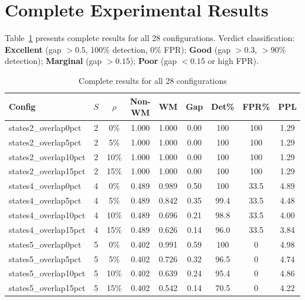 \documentclass[11pt]{article}
\theoremstyle{definition}
\theoremstyle{remark}
\begin{document}
\section{Complete Experimental Results}
\label{app:results}

Table~\ref{tab:full_results} presents complete results for all 28 configurations. Verdict classification: \textbf{Excellent} (gap $>0.5$, 100\% detection, 0\% FPR); \textbf{Good} (gap $>0.3$, $>$90\% detection); \textbf{Marginal} (gap $>0.15$); \textbf{Poor} (gap $<0.15$ or high FPR).

\begin{table}[H]
    \centering
    \caption{Complete results for all 28 configurations}
    \label{tab:full_results}
    \scriptsize
    \begin{tabular}{@{}lcccccccc@{}}
        \toprule
        \textbf{Config} & \textbf{$S$} & \textbf{$\rho$} & \textbf{Non-WM} & \textbf{WM} & \textbf{Gap} & \textbf{Det\%} & \textbf{FPR\%} & \textbf{PPL} \\
        \midrule
        states2\_overlap0pct & 2 & 0\% & 1.000 & 1.000 & 0.00 & 100 & 100 & 1.29 \\
        states2\_overlap5pct & 2 & 5\% & 1.000 & 1.000 & 0.00 & 100 & 100 & 1.29 \\
        states2\_overlap10pct & 2 & 10\% & 1.000 & 1.000 & 0.00 & 100 & 100 & 1.29 \\
        states2\_overlap15pct & 2 & 15\% & 1.000 & 1.000 & 0.00 & 100 & 100 & 1.29 \\
        \midrule
        states4\_overlap0pct & 4 & 0\% & 0.489 & 0.989 & 0.50 & 100 & 33.5 & 4.89 \\
        states4\_overlap5pct & 4 & 5\% & 0.489 & 0.842 & 0.35 & 99.4 & 33.5 & 4.48 \\
        states4\_overlap10pct & 4 & 10\% & 0.489 & 0.696 & 0.21 & 98.8 & 33.5 & 4.00 \\
        states4\_overlap15pct & 4 & 15\% & 0.489 & 0.626 & 0.14 & 96.0 & 33.5 & 3.84 \\
        \midrule
        states5\_overlap0pct & 5 & 0\% & 0.402 & 0.991 & 0.59 & 100 & 0 & 4.98 \\
        states5\_overlap5pct & 5 & 5\% & 0.402 & 0.726 & 0.32 & 96.5 & 0 & 4.74 \\
        states5\_overlap10pct & 5 & 10\% & 0.402 & 0.639 & 0.24 & 95.4 & 0 & 4.86 \\
        states5\_overlap15pct & 5 & 15\% & 0.402 & 0.542 & 0.14 & 70.5 & 0 & 4.22 \\

\end{tabular}
\end{table}
\end{document}
